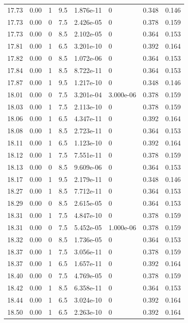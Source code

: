 \documentclass[preview]{standalone}
\begin{document}
{{{{{{{{{{{{{\begin{tabular}{L{1.2cm}C{1.2cm} C{0.3cm}C{0.5cm} C{1.4cm}C{1.4cm} C{1.4cm}C{1.4cm}}
  17.73  &  0.00  & 1     & 9.5 &  1.876e-11  & 0  & 0.348 &  0.146   \\ 
  17.73  &  0.00  & 0     & 7.5 &  2.426e-05  & 0  & 0.378 &  0.159   \\ 
  17.73  &  0.00  & 0     & 8.5 &  2.102e-05  & 0  & 0.364 &  0.153   \\ 
  17.81  &  0.00  & 1     & 6.5 &  3.201e-10  & 0  & 0.392 &  0.164   \\ 
  17.82  &  0.00  & 0     & 8.5 &  1.072e-06  & 0  & 0.364 &  0.153   \\ 
  17.84  &  0.00  & 1     & 8.5 &  8.722e-11  & 0  & 0.364 &  0.153   \\ 
  17.87  &  0.00  & 1     & 9.5 &  1.217e-10  & 0  & 0.348 &  0.146   \\ 
  18.01  &  0.00  & 0     & 7.5 &  3.201e-04  & 3.000e-06  & 0.378 &  0.159   \\ 
  18.03  &  0.00  & 1     & 7.5 &  2.113e-10  & 0  & 0.378 &  0.159   \\ 
  18.06  &  0.00  & 1     & 6.5 &  4.347e-11  & 0  & 0.392 &  0.164   \\ 
  18.08  &  0.00  & 1     & 8.5 &  2.723e-11  & 0  & 0.364 &  0.153   \\ 
  18.11  &  0.00  & 1     & 6.5 &  1.123e-10  & 0  & 0.392 &  0.164   \\ 
  18.12  &  0.00  & 1     & 7.5 &  7.551e-11  & 0  & 0.378 &  0.159   \\ 
  18.13  &  0.00  & 0     & 8.5 &  9.609e-06  & 0  & 0.364 &  0.153   \\ 
  18.17  &  0.00  & 1     & 9.5 &  2.179e-11  & 0  & 0.348 &  0.146   \\ 
  18.27  &  0.00  & 1     & 8.5 &  7.712e-11  & 0  & 0.364 &  0.153   \\ 
  18.29  &  0.00  & 0     & 8.5 &  2.615e-05  & 0  & 0.364 &  0.153   \\ 
  18.31  &  0.00  & 1     & 7.5 &  4.847e-10  & 0  & 0.378 &  0.159   \\ 
  18.31  &  0.00  & 0     & 7.5 &  5.452e-05  & 1.000e-06  & 0.378 &  0.159   \\ 
  18.32  &  0.00  & 0     & 8.5 &  1.736e-05  & 0  & 0.364 &  0.153   \\ 
  18.37  &  0.00  & 1     & 7.5 &  3.056e-11  & 0  & 0.378 &  0.159   \\ 
  18.37  &  0.00  & 1     & 6.5 &  1.657e-11  & 0  & 0.392 &  0.164   \\ 
  18.40  &  0.00  & 0     & 7.5 &  4.769e-05  & 0  & 0.378 &  0.159   \\ 
  18.42  &  0.00  & 1     & 8.5 &  6.358e-11  & 0  & 0.364 &  0.153   \\ 
  18.44  &  0.00  & 1     & 6.5 &  3.024e-10  & 0  & 0.392 &  0.164   \\ 
  18.50  &  0.00  & 1     & 6.5 &  2.263e-10  & 0  & 0.392 &  0.164   \\ 
\hline 
\end{tabular} 

}}}}}}}}}}}}}
\end{document}
